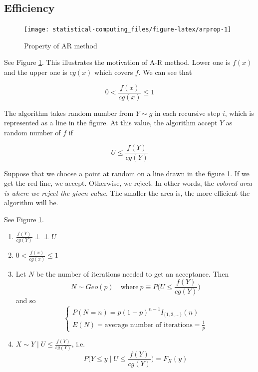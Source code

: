 \documentclass[]{book}
\theoremstyle{definition}
\theoremstyle{definition}
\theoremstyle{definition}
\theoremstyle{remark}
\let\BeginKnitrBlock\begin \let\EndKnitrBlock\end
\begin{document}
\hypertarget{efficiency}{%
\subsection{Efficiency}\label{efficiency}}

\begin{figure}[H]

{\centering \texttt{[image: statistical-computing\_files/figure-latex/arprop-1]} 

}

\caption{Property of AR method}\label{fig:arprop}
\end{figure}

See Figure \ref{fig:arprop}. This illustrates the motivation of A-R method. Lower one is \(f(x)\) and the upper one is \(cg(x)\) which covers \(f\). We can see that

\[0 < \frac{f(x)}{cg(x)} \le 1\]

The algorithm takes random number from \(Y \sim g\) in each recursive step \(i\), which is represented as a line in the figure. At this value, the algorithm accept \(Y\) as random number of \(f\) if

\[U \le \frac{f(Y)}{cg(Y)}\]

Suppose that we choose a point at random on a line drawn in the figure \ref{fig:arprop}. If we get the red line, we accept. Otherwise, we reject. In other words, the \emph{colored area is where we reject the given value}. The smaller the area is, the more efficient the algorithm will be.

\BeginKnitrBlock{proposition}[Properties of A-R Method]
\protect\hypertarget{prp:arnote}{}{\label{prp:arnote} {} }See Figure \ref{fig:arprop}.

\begin{enumerate}
  \item $\frac{f(Y)}{cg(Y)} \perp\!\!\!\perp U$
  \item $0 < \frac{f(x)}{cg(x)} \le 1$
  \item Let $N$ be the number of iterations needed to get an acceptance. Then $$N \sim Geo(p) \quad \text{where}\: p \equiv P\bigg(U \le \frac{f(Y)}{cg(Y)}\bigg)$$ and so
$$
\begin{cases}
  P(N = n) = p(1 - p)^{n - 1}I_{\{1, 2, \ldots \}}(n) \\
  E(N) = \text{average number of iterations} = \frac{1}{p}
\end{cases}
$$
  \item $X \sim Y \mid U \le \frac{f(Y)}{cg(Y)}$, i.e. $$P\bigg(Y \le y \mid U \le \frac{f(Y)}{cg(Y)}\bigg) = F_X(y)$$
\end{enumerate}
\EndKnitrBlock{proposition}
\end{document}
